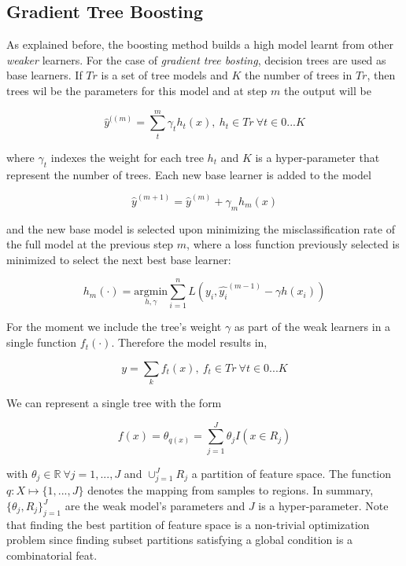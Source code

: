 \documentclass{article}%
\theoremstyle{definition}
\begin{document}
\subsection{Gradient Tree Boosting}

As explained before, the boosting method builds a high model learnt from other \textit{weaker} learners. For the case of \textit{gradient tree bosting}, decision trees are used as base learners. If $Tr$ is a set of tree models and $K$ the number of trees in $Tr$, then trees wil be the parameters for this model and at step $m$ the output will be

\[
\hat{y}^{((m)}=  \sum_t^m \gamma_t h_t(x) , \  h_t \in Tr \ \forall t \in {0...K}
\]

where $\gamma_t$ indexes the weight for each tree $h_t$ and $K$ is a hyper-parameter that represent the number of trees. Each new base learner is added to the model 


\[
\hat{y}^{(m+1)} =   \hat{y}^{(m)}  + \gamma_m h_m(x) 
\]

and the new base model is selected upon minimizing the misclassification rate of the full model at the previous step $m$, where a loss function previously selected is minimized to select the next best base learner:

\[
h_m(\cdot) = \underset{h,\gamma}{\mathrm{argmin}}   \sum_{i=1}^{n} L ( y_i,  \hat{y_i}^{(m-1)} -  \gamma h(x_i)  ) 
\]







For the moment  we  include the tree's weight $\gamma$ as part of the weak learners in a single function $f_t(\cdot)$. Therefore the model results in,

\[
y =  \sum_k f_t(x) ,  \ f_t \in Tr  \ \forall t \in {0...K}
\]

We can represent a single tree with the form 

\[
f(x) = \theta_{q(x)} = \sum_{j=1}^J \theta_j I(x \in  R_j)
\]

with $\theta_j \in \mathbb{R} \ \forall j = 1,...,J$ and $ \cup_{j=1}^J R_j$ a partition of feature space. The function $q : X \mapsto \{1,...,J\}$ denotes the mapping from samples to regions. In summary, $\{\theta_j, R_j\}_{j=1}^J$ are the weak model's parameters and $J$ is a hyper-parameter. Note that finding the best partition of feature space is a non-trivial optimization problem since finding subset partitions satisfying a global condition is a combinatorial feat.
\end{document}
